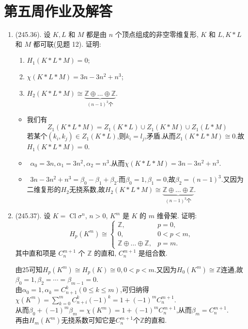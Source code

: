 \section{第五周作业及解答}
\begin{enumerate}
\item(245.36). 设 $K, L$ 和 $M$ 都是由 $n$ 个顶点组成的非空零维复形, $K$ 和 $L, K * L$ 和 $M$ 都可联(见题 12). 证明:
\begin{enumerate}
    \item[(a)] $H_1(K * L * M) = 0$;
    \item[(b)] $\chi(K * L * M) = 3n - 3n^2 + n^3$;
    \item[(c)] $H_2(K * L * M) \cong \underbrace{\mathbb{Z} \oplus \dots \oplus \mathbb{Z}}_{(n-1)^3 \text{个}}$.
\end{enumerate}
\begin{proofc}[解答]
    \begin{itemize}
        \item[(a)]我们有
        $$Z_1(K*L*M)=Z_1(K*L)\cup Z_1(K*M)\cup Z_1(L*M)$$
        若某个$(k_i,k_j)\in Z_1(K*L)$,则$k_i=l_j$,矛盾.从而$Z_1(K*L*M)\cong0$.故$H_1(K*L*M)=0$.
        \item[(b)]~$\alpha_0=3n,\alpha_1=3n^2,\alpha_2=n^3$.从而$\chi(K * L * M) = 3n - 3n^2 + n^3$.
        \item[(c)]~$3n - 3n^2 + n^3=\beta_0-\beta_1+\beta_2$.而$\beta_0=1,\beta_1=0$,故$\beta_2=(n-1)^3$.又因为二维复形的$H_2$无挠系数,故$H_2(K * L * M) \cong \underbrace{\mathbb{Z} \oplus \dots \oplus \mathbb{Z}}_{(n-1)^3 \text{个}}$.
    \end{itemize}
\end{proofc}




\item(245.37). 设 $K = \operatorname{Cl}\sigma^n$, 
$n > 0$, $K^m$ 是 $K$ 的 $m$ 维骨架. 证明:
$$
H_p(K^m) \cong \begin{cases}
\mathbb{Z}, & p = 0, \\
0, & 0 < p < m, \\
\mathbb{Z} \oplus \dots \oplus \mathbb{Z}, & p = m.
\end{cases}
$$
其中直和项是 $C_n^{m+1}$ 个 $\mathbb{Z}$ 的直和, $C_n^{m+1}$ 是组合数.
\begin{proofc}[解答]
    由25可知$H_p(K^m)\cong H_p(K)\cong0,0<p<m$.又因为$H_0(K^m)\cong\mathbb{Z}$连通,故$\beta_0=1,\beta_2=\cdots=\beta_{m-1}=0$.\\
    由$\alpha_0=1,\alpha_k=C^k_{n+1}(0\leqslant k\leqslant m)$,可归纳得$\chi(K^m)=\sum\limits^m_{k=0}C^k_{n+i}(-1)^k=1+(-1)^mC^{m+1}_n$.\\
    从而$\beta_0+(-1)^m\beta_m=\chi(K^m)=1+(-1)^mC^{m+1}_n$,从而$\beta_m=C_n^{m+1}$.\\
    再由$H_m(K^m)$无挠系数可知它是$C^{m+1}_n$个$\mathbb{Z}$的直和.
\end{proofc}
\end{enumerate}

